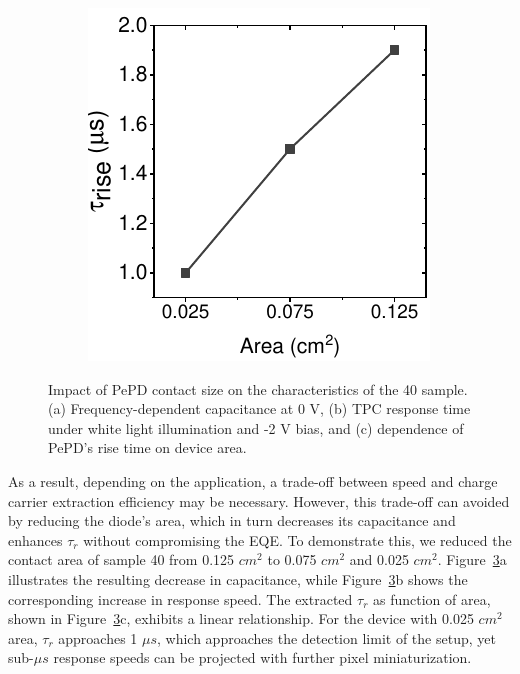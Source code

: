 \begin{figure}[htbp]
\begin{subfigure}{0.3\textwidth}
        \caption{}
        \label{}
    \end{subfigure}
    \hfill
    \begin{subfigure}{0.29\textwidth}
        \centering
        \includegraphics[width=\textwidth]{chapters/transport_layers/images/Rise_time_farea.pdf}
        \caption{}
        \label{}
    \end{subfigure}
    
    \caption[Impact of PePD contact size on the electrical characteristics of the 40 sample.]{Impact of PePD contact size on the characteristics of the 40 sample. (a) Frequency-dependent capacitance at 0 V, (b) TPC response time under white light illumination and -2 V bias, and (c) dependence of PePD's rise time on device area.}
    \label{fig:etl_opt:dev_area}
\end{figure}

As a result, depending on the application, a trade-off between speed and charge carrier extraction efficiency may be necessary. However, this trade-off can avoided by reducing the diode's area, which in turn decreases its capacitance and enhances $\tau_r$ without compromising the EQE. To demonstrate this, we reduced the contact area of sample 40 from 0.125 $cm^2$ to 0.075 $cm^2$ and 0.025 $cm^2$. Figure~\ref{fig:etl_opt:dev_area}a illustrates the resulting decrease in capacitance, while Figure~\ref{fig:etl_opt:dev_area}b shows the corresponding increase in response speed. The extracted $\tau_r$ as function of area, shown in Figure~\ref{fig:etl_opt:dev_area}c, exhibits a linear relationship. For the device with 0.025 $cm^2$ area, $\tau_r$ approaches 1 $\mu s$, which approaches the detection limit of the setup, yet sub-$\mu s$ response speeds can be projected with further pixel miniaturization.

